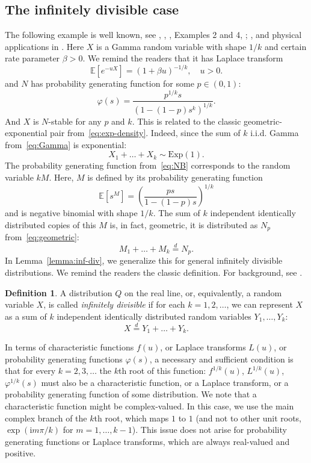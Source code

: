 \documentclass[12pt]{amsart}
\theoremstyle{remark}
\theoremstyle{definition}
\newtheorem{definition}{Definition}[section]
\begin{document}
\subsection{The infinitely divisible case} The following example is well known, see \cite[Chapter I, Example 8.5; Chapter V, Example 13.2]{Harris},  \cite[Section 8]{B}, \cite[Section 6]{Stable}, Examples 2 and 4, \cite[Example 1]{Bunge}; \cite[Example 3]{Melamed}, and physical applications in \cite[Section 8]{Harris1948}. Here $X$ is a Gamma random variable with shape $1/k$ and certain rate parameter $\beta > 0$. We remind the readers that it has Laplace transform
\begin{equation}
\label{eq:Gamma}
\mathbb E[e^{-uX}] = (1 + \beta u)^{-1/k},\quad u > 0.
\end{equation}
and $N$ has probability generating function for some $p \in (0, 1)$: 
\begin{equation}
\label{eq:NB}
\varphi(s) = \frac{p^{1/k}s}{(1 - (1 - p)s^k)^{1/k}}.
\end{equation}
And $X$ is $N$-stable for any $p$ and $k$. This is related to the classic geometric-exponential pair from~\eqref{eq:exp-density}. Indeed, since the sum of $k$ i.i.d. Gamma from~\eqref{eq:Gamma} is exponential:
$$
X_1 + \ldots + X_k \sim  \mathrm{Exp}(1).
$$
The probability generating function from~\eqref{eq:NB} corresponds to the random variable $kM$. Here, $M$ is defined by its  probability generating function 
$$
\mathbb E[s^M] = \left(\frac{ps}{1 - (1-p)s}\right)^{1/k}
$$
and is negative binomial with shape $1/k$. The sum of $k$ independent identically distributed copies of this $M$ is, in fact, geometric, it is distributed as $N_p$ from~\eqref{eq:geometric}:
$$
M_1 + \ldots + M_k \stackrel{d}{=} N_p. 
$$
In Lemma~\ref{lemma:inf-div}, we generalize this for general infinitely divisible distributions. We remind the readers the classic definition. For background, see \cite{SteutelBook}. 

\begin{definition} A distribution $Q$ on the real line, or, equivalently, a random variable $X$, is called {\it infinitely divisible} if for each $k = 1, 2, \ldots$, we can represent $X$ as a sum of $k$ independent identically distributed random variables $Y_1, \ldots, Y_k$:
$$
X \stackrel{d}{=} Y_1 + \ldots + Y_k.
$$
\end{definition}

In terms of characteristic functions $f(u)$, or Laplace transforms $L(u)$, or probability generating functions $\varphi(s)$, a necessary and sufficient condition is that for every $k = 2, 3, \ldots$ the $k$th root of this function: $f^{1/k}(u)$, $L^{1/k}(u)$, $\varphi^{1/k}(s)$ must also be a characteristic function, or a Laplace transform, or a probability generating function of some distribution. We note that a characteristic function might be complex-valued. In this case, we use the main complex branch of the $k$th root, which maps $1$ to $1$ (and not to other unit roots, $\exp(\mathrm{i}m\pi/k)$ for $m = 1, \ldots, k-1$). This issue does not arise for probability generating functions or Laplace transforms, which are always real-valued and positive. 
\end{document}
